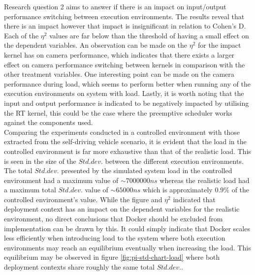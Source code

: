 Research question 2 aims to answer if there is an impact on input/output performance switching between execution environments. The results reveal that there is an impact however that impact is insignificant in relation to Cohen's D. Each of the $\eta^{2}$ values are far below than the threshold of having a small effect on the dependent variables. An observation can be made on the $\eta^{2}$ for the impact kernel has on camera performance, which indicates that there exists a larger effect on camera performance switching between kernels in comparison with the other treatment variables. One interesting point can be made on the camera performance during load, which seems to perform better when running any of the execution environments on system with load. Lastly, it is worth noting that the input and output performance is indicated to be negatively impacted by utilising the RT kernel, this could be the case where the preemptive scheduler works against the components used.\\

Comparing the experiments conducted in a controlled environment with those extracted from the self-driving vehicle scenario, it is evident that the load in the controlled environment is far more exhaustive than that of the realistic load. This is seen in the size of the $Std. dev.$ between the different execution environments. The total $Std. dev.$ presented by the simulated system load in the controlled environment had a maximum value of $\sim7000000ns$ whereas the realistic load had a maximum total $Std. dev.$ value of $\sim65000ns$ which is approximately $0.9\%$ of the controlled environment's value. While the figure and $\eta^{2}$ indicated that deployment context has an impact on the dependent variables for the realistic environment, no direct conclusions that Docker should be excluded from implementation can be drawn by this. It could simply indicate that Docker scales less efficiently when introducing load to the system where both execution environments may reach an equilibrium eventually when increasing the load. This equilibrium may be observed in figure \ref{fig:pi-std-chart-load} where both deployment contexts share roughly the same total $Std. dev.$.